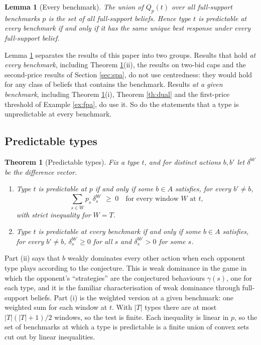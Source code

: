 \documentclass[12pt]{article}
\newtheorem{theorem}{Theorem}
\newtheorem{lemma}{Lemma}
\theoremstyle{definition}
\begin{document}
\begin{lemma}[Every benchmark]\label{lem:union}
The union of $Q_p(t)$ over all full-support benchmarks $p$ is the set of all full-support beliefs. Hence type $t$ is predictable at every benchmark if and only if it has the same unique best response under every full-support belief.
\end{lemma}

Lemma \ref{lem:union} separates the results of this paper into two groups. Results that hold \emph{at every benchmark}, including Theorem \ref{th:dominance}(ii), the results on two-bid caps and the second-price results of Section \ref{sec:spa}, do not use centredness: they would hold for any class of beliefs that contains the benchmark. Results \emph{at a given benchmark}, including Theorem \ref{th:dominance}(i), Theorem \ref{th:dual} and the first-price threshold of Example \ref{ex:fpa}, do use it. So do the statements that a type is unpredictable at every benchmark.

\subsection{Predictable types}

\begin{theorem}[Predictable types]\label{th:dominance}
Fix a type $t$, and for distinct actions $b, b'$ let $\delta^{bb'}$ be the difference vector.
\begin{enumerate}
\item[(i)] Type $t$ is predictable at $p$ if and only if some $b \in A$ satisfies, for every $b' \neq b$,
\[
\sum_{s \in W} p_s\, \delta^{bb'}_s \;\ge\; 0 \quad \text{for every window } W \text{ at } t,
\]
with strict inequality for $W = T$.
\item[(ii)] Type $t$ is predictable at every benchmark if and only if some $b \in A$ satisfies, for every $b' \neq b$, $\delta^{bb'}_s \ge 0$ for all $s$ and $\delta^{bb'}_s > 0$ for some $s$.
\end{enumerate}
\end{theorem}

Part (ii) says that $b$ weakly dominates every other action when each opponent type plays according to the conjecture. This is weak dominance in the game in which the opponent's ``strategies'' are the conjectured behaviours $\gamma(s)$, one for each type, and it is the familiar characterisation of weak dominance through full-support beliefs. Part (i) is the weighted version at a given benchmark: one weighted sum for each window at $t$. With $|T|$ types there are at most $|T|(|T|+1)/2$ windows, so the test is finite. Each inequality is linear in $p$, so the set of benchmarks at which a type is predictable is a finite union of convex sets cut out by linear inequalities.
\end{document}
